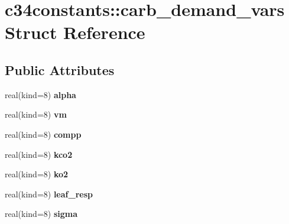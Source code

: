 \hypertarget{structc34constants_1_1carb__demand__vars}{
\section{c34constants::carb\_\-demand\_\-vars Struct Reference}
\label{structc34constants_1_1carb__demand__vars}
}
\subsection*{Public Attributes}
\begin{DoxyCompactItemize}
\item 
\hypertarget{structc34constants_1_1carb__demand__vars_a22fe45e5faa286e313276efe694f9d23}{
real(kind=8) {\bfseries alpha}}
\label{structc34constants_1_1carb__demand__vars_a22fe45e5faa286e313276efe694f9d23}

\item 
\hypertarget{structc34constants_1_1carb__demand__vars_a64dcbcdfb1d4617b3a9c99f1657ec258}{
real(kind=8) {\bfseries vm}}
\label{structc34constants_1_1carb__demand__vars_a64dcbcdfb1d4617b3a9c99f1657ec258}

\item 
\hypertarget{structc34constants_1_1carb__demand__vars_acddd9256c273f3ac4d62582e1cc453b3}{
real(kind=8) {\bfseries compp}}
\label{structc34constants_1_1carb__demand__vars_acddd9256c273f3ac4d62582e1cc453b3}

\item 
\hypertarget{structc34constants_1_1carb__demand__vars_af11d38026ea671e5c8521203c9052776}{
real(kind=8) {\bfseries kco2}}
\label{structc34constants_1_1carb__demand__vars_af11d38026ea671e5c8521203c9052776}

\item 
\hypertarget{structc34constants_1_1carb__demand__vars_aae44690da99deccb62eac8ed24ebebbd}{
real(kind=8) {\bfseries ko2}}
\label{structc34constants_1_1carb__demand__vars_aae44690da99deccb62eac8ed24ebebbd}

\item 
\hypertarget{structc34constants_1_1carb__demand__vars_ac54f73f855d51ecbc90f86761f40556f}{
real(kind=8) {\bfseries leaf\_\-resp}}
\label{structc34constants_1_1carb__demand__vars_ac54f73f855d51ecbc90f86761f40556f}

\item 
\hypertarget{structc34constants_1_1carb__demand__vars_a57ece5483dad8b476f1a19c47df8a317}{
real(kind=8) {\bfseries sigma}}
\label{structc34constants_1_1carb__demand__vars_a57ece5483dad8b476f1a19c47df8a317}


\end{DoxyCompactItemize}
